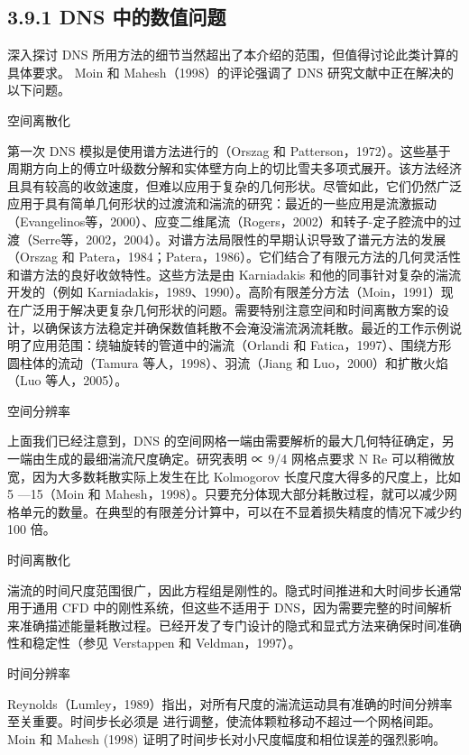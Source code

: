 \documentclass[11pt,a4paper,openany,fontset=none]{ctexbook}
\begin{document}
\subsection*{3.9.1 DNS 中的数值问题}

深入探讨 DNS 所用方法的细节当然超出了本介绍的范围，但值得讨论此类计算的具体要求。 Moin 和 Mahesh（1998）的评论强调了 DNS 研究文献中正在解决的以下问题。

空间离散化

第一次 DNS 模拟是使用谱方法进行的（Orszag 和 Patterson，1972）。这些基于周期方向上的傅立叶级数分解和实体壁方向上的切比雪夫多项式展开。该方法经济且具有较高的收敛速度，但难以应用于复杂的几何形状。尽管如此，它们仍然广泛应用于具有简单几何形状的过渡流和湍流的研究：最近的一些应用是流激振动（Evangelinos等，2000）、应变二维尾流（Rogers，2002）和转子-定子腔流中的过渡（Serre等，2002，2004）。对谱方法局限性的早期认识导致了谱元方法的发展（Orszag 和 Patera，1984；Patera，1986）。它们结合了有限元方法的几何灵活性和谱方法的良好收敛特性。这些方法是由 Karniadakis 和他的同事针对复杂的湍流开发的（例如 Karniadakis，1989、1990）。高阶有限差分方法（Moin，1991）现在广泛用于解决更复杂几何形状的问题。需要特别注意空间和时间离散方案的设计，以确保该方法稳定并确保数值耗散不会淹没湍流涡流耗散。最近的工作示例说明了应用范围：绕轴旋转的管道中的湍流（Orlandi 和 Fatica，1997）、围绕方形圆柱体的流动（Tamura 等人，1998）、羽流（Jiang 和 Luo，2000）和扩散火焰（Luo 等人，2005）。

空间分辨率

上面我们已经注意到，DNS 的空间网格一端由需要解析的最大几何特征确定，另一端由生成的最细湍流尺度确定。研究表明 ∝ 9/4 网格点要求 N Re 可以稍微放宽，因为大多数耗散实际上发生在比 Kolmogorov 长度尺度大得多的尺度上，比如 5 —15（Moin 和 Mahesh，1998）。只要充分体现大部分耗散过程，就可以减少网格单元的数量。在典型的有限差分计算中，可以在不显着损失精度的情况下减少约 100 倍。

时间离散化

湍流的时间尺度范围很广，因此方程组是刚性的。隐式时间推进和大时间步长通常用于通用 CFD 中的刚性系统，但这些不适用于 DNS，因为需要完整的时间解析来准确描述能量耗散过程。已经开发了专门设计的隐式和显式方法来确保时间准确性和稳定性（参见 Verstappen 和 Veldman，1997）。

时间分辨率

Reynolds（Lumley，1989）指出，对所有尺度的湍流运动具有准确的时间分辨率至关重要。时间步长必须是
进行调整，使流体颗粒移动不超过一个网格间距。 Moin 和 Mahesh (1998) 证明了时间步长对小尺度幅度和相位误差的强烈影响。
\end{document}
